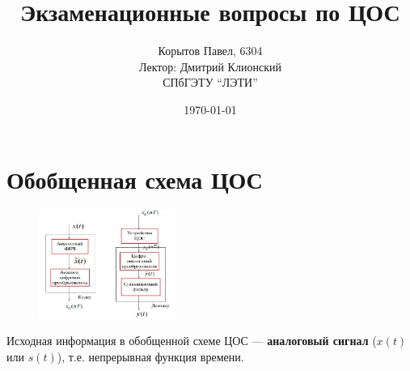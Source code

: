 \documentclass[a4paper, 14pt]{extarticle}
\title{Экзаменационные вопросы по ЦОС}
\author{Корытов Павел, 6304 \\ Лектор: Дмитрий Клионский\\ СПбГЭТУ \enquote{ЛЭТИ}}
\date{\today}
\begin{document}
{\small
\maketitle
}

\setcounter{secnumdepth}{4}
\setcounter{tocdepth}{1}
\tableofcontents{}
\section{Обобщенная схема ЦОС}
\begin{figure}[h]
    \centering
    \includegraphics[width=0.4\textwidth]{img/S001.jpg}
\end{figure}
Исходная информация в обобщенной схеме ЦОС --- \textbf{аналоговый сигнал} ($x(t)$ или $s(t)$), т.е. непрерывная функция времени.
\end{document}
